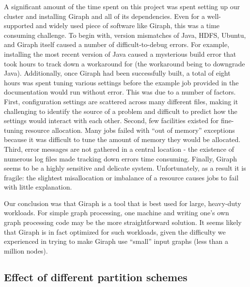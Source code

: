 A significant amount of the time spent on this project was spent setting up our 
cluster and installing Giraph and all of its dependencies. Even for a 
well-supported and widely used piece of software like Giraph, this was a time 
consuming challenge. To begin with, version mismatches of Java, HDFS, Ubuntu, 
and Giraph itself caused a number of difficult-to-debug errors. For example, 
installing the most recent version of Java caused a mysterious build error that 
took hours to track down a workaround for (the workaround being to downgrade 
Java). Additionally, once Giraph had been successfully built, a total of eight 
hours was spent tuning various settings before the example job provided in the 
documentation would run without error. This was due to a number of factors. 
First, configuration settings are scattered across many different files, making 
it challenging to identify the source of a problem and difficult to predict how 
the settings would interact with each other. Second, few facilities existed for 
fine-tuning resource allocation. Many jobs failed with ``out of memory'' 
exceptions because it was difficult to tune the amount of memory they would be 
allocated. Third, error messages are not gathered in a central location - the 
existence of numerous log files made tracking down errors time consuming. 
Finally, Giraph seems to be a highly sensitive and delicate system. 
Unfortunately, as a result it is fragile: the slightest misallocation or 
imbalance of a resource causes jobs to fail with little explanation.

Our conclusion was that Giraph is a tool that is best used for large, 
heavy-duty workloads. For simple graph processing, one machine and writing 
one's own graph processing code may be the more straightforward solution. It 
seems likely that Giraph is in fact optimized for such workloads, given the 
difficulty we experienced in trying to make Giraph use ``small'' input graphs 
(less than a million 
nodes).

\subsection{Effect of different partition schemes}
